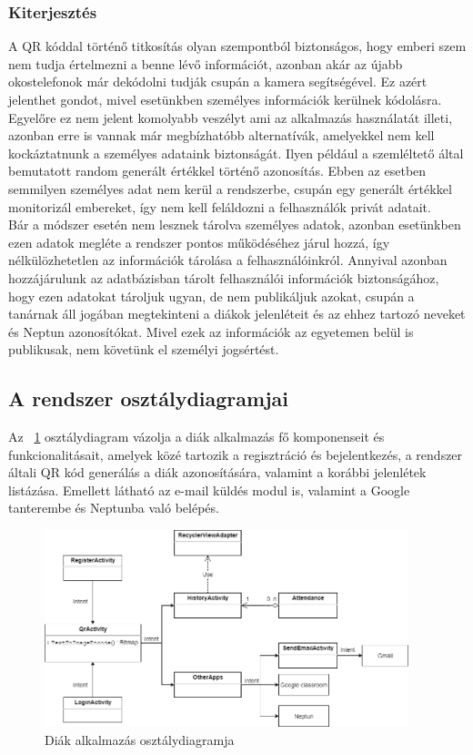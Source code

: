 \documentclass[12pt]{article}
\numberwithin{figure}{section}
\numberwithin{equation}{section}
\begin{document}
\subsubsection{Kiterjesztés}
A QR kóddal történő titkosítás olyan szempontból biztonságos, hogy emberi szem nem tudja értelmezni a benne lévő információt, azonban akár az újabb okostelefonok már dekódolni tudják csupán a kamera segítségével. Ez azért jelenthet gondot, mivel esetünkben személyes információk kerülnek kódolásra. Egyelőre ez nem jelent komolyabb veszélyt ami az alkalmazás használatát illeti, azonban erre is vannak már megbízhatóbb alternatívák, amelyekkel nem kell kockáztatnunk a személyes adataink biztonságát. Ilyen például a \cite{17} szemléltető által bemutatott random generált értékkel történő azonosítás. Ebben az esetben semmilyen személyes adat nem kerül a rendszerbe, csupán egy generált értékkel monitorizál embereket, így nem kell feláldozni a felhasználók privát adatait.\\
Bár a módszer esetén nem lesznek tárolva személyes adatok, azonban esetünkben ezen adatok megléte a rendszer pontos működéséhez járul hozzá, így nélkülözhetetlen az információk tárolása a felhasználóinkról. Annyival azonban hozzájárulunk az adatbázisban tárolt felhasználói információk biztonságához, hogy ezen adatokat tároljuk ugyan, de nem publikáljuk azokat, csupán a tanárnak áll jogában megtekinteni a diákok jelenléteit és az ehhez tartozó neveket és Neptun azonosítókat. Mivel ezek az információk az egyetemen belül is publikusak, nem követünk el személyi jogsértést. \\

\subsection{A rendszer osztálydiagramjai}

Az ~\ref{fig:class2} osztálydiagram vázolja a diák alkalmazás fő komponenseit és funkcionalitásait, amelyek közé tartozik a regisztráció és bejelentkezés, a rendszer általi QR kód generálás a diák azonosítására, valamint a korábbi jelenlétek listázása. Emellett látható az e-mail küldés modul is, valamint a Google tanterembe és Neptunba való belépés.\\

\begin{figure}[H]
	\centering
	\includegraphics[width=400px]{stud_class.png}
	\caption{Diák alkalmazás osztálydiagramja}
	\label{fig:class2}
\end{figure}
\end{document}
